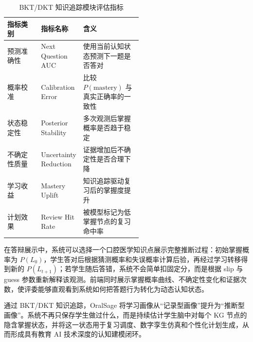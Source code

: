 \begin{table}[H]
  \centering
  \caption{BKT/DKT 知识追踪模块评估指标}
  \label{tab:kt-evaluation}
  \begin{tabularx}{\linewidth}{p{0.25\linewidth}p{0.30\linewidth}X}
    \toprule
    指标类别 & 指标名称 & 含义 \\
    \midrule
    预测准确性 & Next Question AUC & 使用当前认知状态预测下一题是否答对 \\
    概率校准 & Calibration Error & 比较 $P(\mathrm{mastery})$ 与真实正确率的一致性 \\
    状态稳定性 & Posterior Stability & 多次观测后掌握概率是否趋于稳定 \\
    不确定性质量 & Uncertainty Reduction & 证据增加后不确定性是否合理下降 \\
    学习收益 & Mastery Uplift & 知识追踪驱动复习后的掌握度提升 \\
    计划效果 & Review Hit Rate & 被模型标记为低掌握节点的复习命中率 \\
    \bottomrule
  \end{tabularx}
\end{table}

在答辩展示中，系统可以选择一个口腔医学知识点展示完整推断过程：初始掌握概率为 $P(L_0)$，学生答对后根据猜测概率和失误概率计算后验，再经过学习转移得到新的 $P(L_{t+1})$；若学生随后答错，系统不会简单扣固定分，而是根据 slip 与 guess 参数重新解释该观测。前端同时展示掌握概率曲线、不确定性变化和证据次数，使评委能够直观看到系统如何把答题行为转化为动态认知状态。

通过 BKT/DKT 知识追踪，OralSage 将学习画像从“记录型画像”提升为“推断型画像”。系统不再只保存学生做过什么，而是持续估计学生脑中对每个 KG 节点的隐含掌握状态，并将这一状态用于复习调度、数字孪生仿真和个性化计划生成，从而形成具有教育 AI 技术深度的认知建模闭环。

